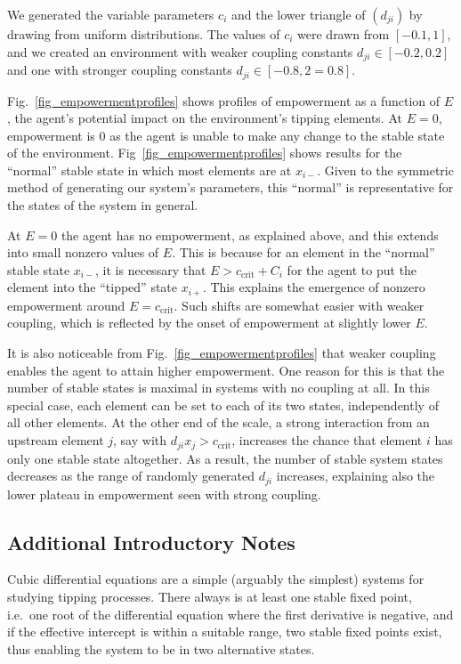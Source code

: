 \documentclass[conference]{IEEEtran}
\newcommand{\ccrit}{\ensuremath{c_{\mathrm{crit}}}}
\begin{document}
We generated the variable parameters $c_i$ and the lower triangle of
$(d_{ji})$ by drawing from uniform distributions. The values of $c_i$
were drawn from $[-0.1, 1]$, and we created an environment with weaker
coupling constants $d_{ji} \in [-0.2, 0.2]$ and one with stronger
coupling constants $d_{ji} \in [-0.8, 2=0.8]$.

Fig.~\ref{fig_empowermentprofiles} shows profiles of empowerment as a
function of $E$, the agent's potential impact on the environment's
tipping elements. At $E = 0$, empowerment is $0$ as the agent is
unable to make any change to the stable state of the environment.
Fig~\ref{fig_empowermentprofiles} shows results for the ``normal''
stable state in which most elements are at $x_{i-}$. Given to the
symmetric method of generating our system's parameters, this
``normal'' is representative for the states of the system in general.

At $E = 0$ the agent has no empowerment, as explained above, and this
extends into small nonzero values of $E$. This is because for an
element in the ``normal'' stable state $x_{i-}$, it is necessary that
$E > \ccrit + C_i$ for the agent to put the element into the
``tipped'' state $x_{i+}$. This explains the emergence of nonzero
empowerment around $E = \ccrit$. Such shifts are somewhat easier with
weaker coupling, which is reflected by the onset of empowerment at
slightly lower $E$.

It is also noticeable from Fig.~\ref{fig_empowermentprofiles} that
weaker coupling enables the agent to attain higher empowerment. One
reason for this is that the number of stable states is maximal in
systems with no coupling at all. In this special case, each element
can be set to each of its two states, independently of all other
elements. At the other end of the scale, a strong interaction from an
upstream element $j$, say with $d_{ji} x_j > \ccrit$, increases the
chance that element $i$ has only one stable state altogether. As a
result, the number of stable system states decreases as the range of
randomly generated $d_{ji}$ increases, explaining also the lower
plateau in empowerment seen with strong coupling.


\subsection{Additional Introductory Notes}

Cubic differential equations are a simple (arguably the simplest)
systems for studying tipping processes. There always is at least one
stable fixed point, i.e.\ one root of the differential equation where
the first derivative is negative, and if the effective intercept is
within a suitable range, two stable fixed points exist, thus enabling
the system to be in two alternative states.
\end{document}

